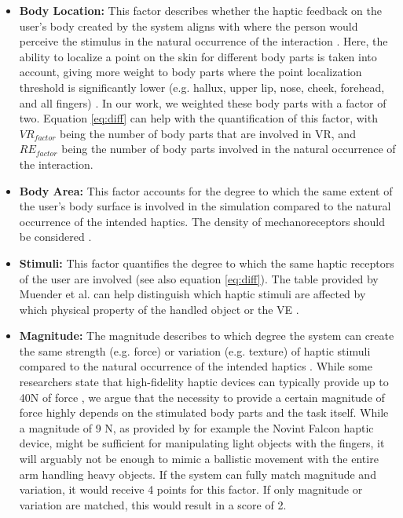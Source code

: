 \begin{itemize}
    \item \textbf{Body Location:} 
    This factor describes whether the haptic feedback on the user's body created by the system aligns with where the person would perceive the stimulus in the natural occurrence of the interaction \cite{Muender2022HapticReality}. Here, the ability to localize a point on the skin for different body parts is taken into account, giving more weight to body parts where the point localization threshold is significantly lower (e.g. hallux, upper lip, nose, cheek, forehead, and all fingers) \cite{Lederman2009HapticTutorial}. In our work, we weighted these body parts with a factor of two.
    Equation \ref{eq:diff} can help with the quantification of this factor, with $VR_{factor}$ being the number of body parts that are involved in VR, and $RE_{factor}$ being the number of body parts involved in the natural occurrence of the interaction.
    
    \item \textbf{Body Area:} 
    This factor accounts for the degree to which the same extent of the user's body surface is involved in the simulation compared to the natural occurrence of the intended haptics. The density of mechanoreceptors should be considered \cite{Muender2022HapticReality, Lederman2009HapticTutorial}.

    \item \textbf{Stimuli:}
    This factor quantifies the degree to which the same haptic receptors of the user are involved (see also equation \ref{eq:diff}). The table provided by Muender et al. can help distinguish which haptic stimuli are affected by which physical property of the handled object or the VE \cite{Muender2022HapticReality}.
    
    \item \textbf{Magnitude:}
    The magnitude describes to which degree the system can create the same strength (e.g. force) or variation (e.g. texture) of haptic stimuli compared to the natural occurrence of the intended haptics \cite{Muender2022HapticReality}. While some researchers state that high-fidelity haptic devices can typically provide up to 40N of force \cite{Grant2019}, we argue that the necessity to provide a certain magnitude of force highly depends on the stimulated body parts and the task itself. While a magnitude of 9 N, as provided by for example the Novint Falcon haptic device, might be sufficient for manipulating light objects with the fingers, it will arguably not be enough to mimic a ballistic movement with the entire arm handling heavy objects.
    If the system can fully match magnitude and variation, it would receive 4 points for this factor. If only magnitude or variation are matched, this would result in a score of 2.


\end{itemize}

